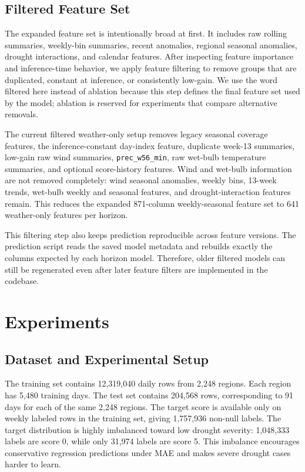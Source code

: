 \documentclass[conference]{IEEEtran}
\begin{document}
\subsection{Filtered Feature Set}

The expanded feature set is intentionally broad at first. It includes raw
rolling summaries, weekly-bin summaries, recent anomalies, regional seasonal
anomalies, drought interactions, and calendar features. After inspecting feature
importance and inference-time behavior, we apply feature filtering to remove
groups that are duplicated, constant at inference, or consistently low-gain. We
use the word filtered here instead of ablation because this step defines the
final feature set used by the model; ablation is reserved for experiments that
compare alternative removals.

The current filtered weather-only setup removes legacy seasonal coverage
features, the inference-constant day-index feature, duplicate week-13 summaries,
low-gain raw wind summaries, \texttt{prec\_w56\_min}, raw wet-bulb temperature
summaries, and optional score-history features. Wind and wet-bulb information
are not removed completely: wind seasonal anomalies, weekly bins, 13-week
trends, wet-bulb weekly and seasonal features, and drought-interaction features
remain. This reduces the expanded 871-column weekly-seasonal feature set to 641
weather-only features per horizon.

This filtering step also keeps prediction reproducible across feature versions.
The prediction script reads the saved model metadata and rebuilds exactly the
columns expected by each horizon model. Therefore, older filtered models can
still be regenerated even after later feature filters are implemented in the
codebase.

\section{Experiments}

\subsection{Dataset and Experimental Setup}

The training set contains 12,319,040 daily rows from 2,248 regions. Each region
has 5,480 training days. The test set contains 204,568 rows, corresponding to
91 days for each of the same 2,248 regions. The target score is available only
on weekly labeled rows in the training set, giving 1,757,936 non-null labels.
The target distribution is highly imbalanced toward low drought severity:
1,048,333 labels are score 0, while only 31,974 labels are score 5. This
imbalance encourages conservative regression predictions under MAE and makes
severe drought cases harder to learn.
\end{document}
